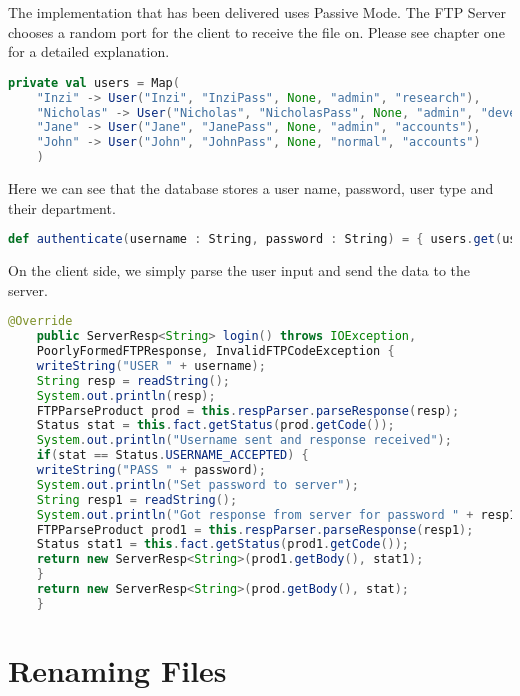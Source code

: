 The implementation that has been delivered uses Passive Mode. The FTP Server chooses a random port for the
client to receive the file on. Please see chapter one for a detailed explanation.

\begin{lstlisting}[language=Scala, caption=Database of users, tabsize=2]
	private val users = Map(
	"Inzi" -> User("Inzi", "InziPass", None, "admin", "research"),
	"Nicholas" -> User("Nicholas", "NicholasPass", None, "admin", "development"),
	"Jane" -> User("Jane", "JanePass", None, "admin", "accounts"),
	"John" -> User("John", "JohnPass", None, "normal", "accounts")
	)

\end{lstlisting}

Here we can see that the database stores a user name, password, user type and their department.

\begin{lstlisting}[language=Scala, caption=Authentication, tabsize=2]
	def authenticate(username : String, password : String) = { users.get(username) }

\end{lstlisting}

\newpage
On the client side, we simply parse the user input and send the data to the server.
\begin{lstlisting}[language=Java, caption=Send authentication data to the server, showstringspaces=false, tabsize=2]
	@Override
	public ServerResp<String> login() throws IOException,
	PoorlyFormedFTPResponse, InvalidFTPCodeException {
	writeString("USER " + username);
	String resp = readString();
	System.out.println(resp);
	FTPParseProduct prod = this.respParser.parseResponse(resp);
	Status stat = this.fact.getStatus(prod.getCode());
	System.out.println("Username sent and response received");
	if(stat == Status.USERNAME_ACCEPTED) {
	writeString("PASS " + password);
	System.out.println("Set password to server");
	String resp1 = readString();
	System.out.println("Got response from server for password " + resp1);
	FTPParseProduct prod1 = this.respParser.parseResponse(resp1);
	Status stat1 = this.fact.getStatus(prod1.getCode());
	return new ServerResp<String>(prod1.getBody(), stat1);
	}
	return new ServerResp<String>(prod.getBody(), stat);
	}
\end{lstlisting}
\newpage
\section{Renaming Files}

